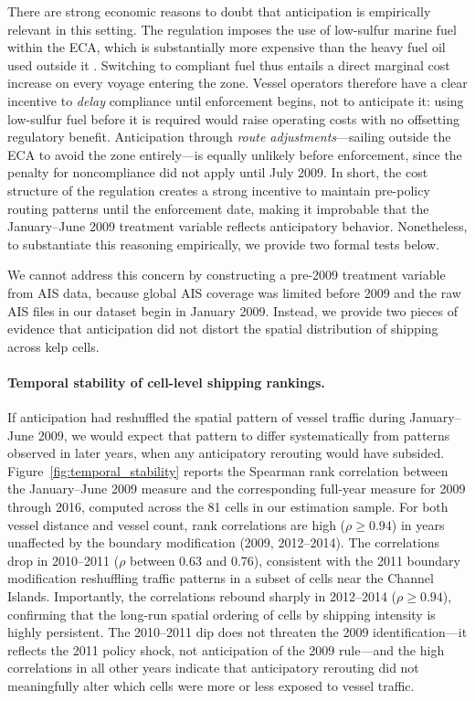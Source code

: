 \documentclass[12pt]{article}
\begin{document}
There are strong economic reasons to doubt that anticipation is empirically relevant in this setting. The regulation imposes the use of low-sulfur marine fuel within the ECA, which is substantially more expensive than the heavy fuel oil used outside it \citep{Klotz2022}. Switching to compliant fuel thus entails a direct marginal cost increase on every voyage entering the zone. Vessel operators therefore have a clear incentive to \emph{delay} compliance until enforcement begins, not to anticipate it: using low-sulfur fuel before it is required would raise operating costs with no offsetting regulatory benefit. Anticipation through \emph{route adjustments}---sailing outside the ECA to avoid the zone entirely---is equally unlikely before enforcement, since the penalty for noncompliance did not apply until July 2009. In short, the cost structure of the regulation creates a strong incentive to maintain pre-policy routing patterns until the enforcement date, making it improbable that the January--June 2009 treatment variable reflects anticipatory behavior. Nonetheless, to substantiate this reasoning empirically, we provide two formal tests below.

We cannot address this concern by constructing a pre-2009 treatment variable from AIS data, because global AIS coverage was limited before 2009 and the raw AIS files in our dataset begin in January 2009. Instead, we provide two pieces of evidence that anticipation did not distort the spatial distribution of shipping across kelp cells.

\paragraph{Temporal stability of cell-level shipping rankings.}
If anticipation had reshuffled the spatial pattern of vessel traffic during January--June 2009, we would expect that pattern to differ systematically from patterns observed in later years, when any anticipatory rerouting would have subsided. Figure~\ref{fig:temporal_stability} reports the Spearman rank correlation between the January--June 2009 measure and the corresponding full-year measure for 2009 through 2016, computed across the 81 cells in our estimation sample. For both vessel distance and vessel count, rank correlations are high ($\rho\geq 0.94$) in years unaffected by the boundary modification (2009, 2012--2014). The correlations drop in 2010--2011 ($\rho$ between 0.63 and 0.76), consistent with the 2011 boundary modification reshuffling traffic patterns in a subset of cells near the Channel Islands. Importantly, the correlations rebound sharply in 2012--2014 ($\rho\geq 0.94$), confirming that the long-run spatial ordering of cells by shipping intensity is highly persistent. The 2010--2011 dip does not threaten the 2009 identification---it reflects the 2011 policy shock, not anticipation of the 2009 rule---and the high correlations in all other years indicate that anticipatory rerouting did not meaningfully alter which cells were more or less exposed to vessel traffic.
\end{document}
